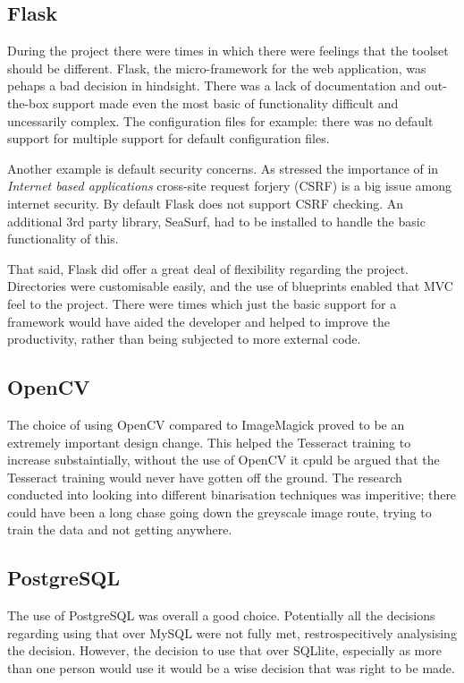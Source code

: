 \subsection{Flask}
During the project there were times in which there were feelings that the toolset should be different. Flask, the micro-framework for the web application, was pehaps a bad decision in hindsight. There was a lack of documentation and out-the-box support made even the most basic of functionality difficult and uncessarily complex. The configuration files for example: there was no default support for multiple support for default configuration files.

Another example is default security concerns. As stressed the importance of in \textit{Internet based applications} cross-site request forjery (CSRF) is a big issue among internet security. By default Flask does not support CSRF checking. An additional 3rd party library, SeaSurf, had to be installed to handle the basic functionality of this.

That said, Flask did offer a great deal of flexibility regarding the project. Directories were customisable easily, and the use of blueprints enabled that MVC feel to the project. There were times which just the basic support for a framework would have aided the developer and helped to improve the productivity, rather than being subjected to more external code.
\subsection{OpenCV}
The choice of using OpenCV compared to ImageMagick proved to be an extremely important design change. This helped the Tesseract training to increase substaintially, without the use of OpenCV it cpuld be argued that the Tesseract training would never have gotten off the ground. The research conducted into looking into different binarisation techniques was imperitive; there could have been a long chase going down the greyscale image route, trying to train the data and not getting anywhere.

\subsection{PostgreSQL}
The use of PostgreSQL was overall a good choice. Potentially all the decisions regarding using that over MySQL were not fully met, restrospecitively analysising the decision.  However, the decision to use that over SQLlite, especially as more than one person would use it would be a wise decision that was right to be made.

